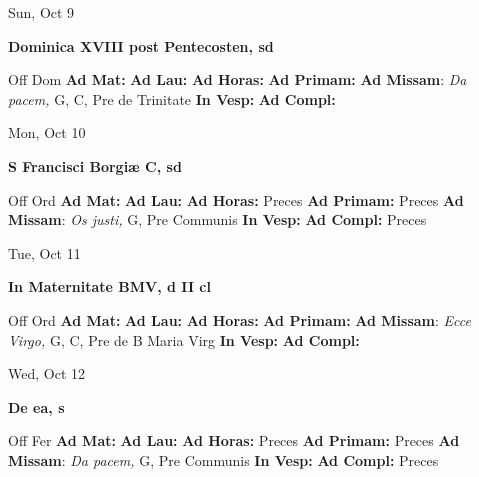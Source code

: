 \documentclass[10pt]{article}
\begin{document}
\begin{minipage}{3.5in}
\vspace{2em}\begin{center}
Sun, Oct 9
\end{center}\textbf{ \large Dominica XVIII post Pentecosten, \textnormal{\normalsize sd}}
\begin{justify}
Off Dom
\textbf{Ad Mat: }
\textbf{Ad Lau: }
\textbf{Ad Horas: }
\textbf{Ad Primam: }
\textbf{Ad Missam}: \textit{Da pacem,} G, C, Pre de Trinitate
\textbf{In Vesp: }
\textbf{Ad Compl: }\end{justify}
\end{minipage}



\begin{minipage}{3.5in}
\vspace{2em}\begin{center}
Mon, Oct 10
\end{center}\textbf{ \large S Francisci Borgiæ C, \textnormal{\normalsize sd}}
\begin{justify}
Off Ord
\textbf{Ad Mat: }
\textbf{Ad Lau: }
\textbf{Ad Horas: }Preces
\textbf{Ad Primam: }Preces
\textbf{Ad Missam}: \textit{Os justi,} G, Pre Communis
\textbf{In Vesp: }
\textbf{Ad Compl: }Preces\end{justify}
\end{minipage}



\begin{minipage}{3.5in}
\vspace{2em}\begin{center}
Tue, Oct 11
\end{center}\textbf{ \large In Maternitate BMV, \textnormal{\normalsize d II cl}}
\begin{justify}
Off Ord
\textbf{Ad Mat: }
\textbf{Ad Lau: }
\textbf{Ad Horas: }
\textbf{Ad Primam: }
\textbf{Ad Missam}: \textit{Ecce Virgo,} G, C, Pre de B Maria Virg
\textbf{In Vesp: }
\textbf{Ad Compl: }\end{justify}
\end{minipage}



\begin{minipage}{3.5in}
\vspace{2em}\begin{center}
Wed, Oct 12
\end{center}\textbf{ \large De ea, \textnormal{\normalsize s}}
\begin{justify}
Off Fer
\textbf{Ad Mat: }
\textbf{Ad Lau: }
\textbf{Ad Horas: }Preces
\textbf{Ad Primam: }Preces
\textbf{Ad Missam}: \textit{Da pacem,} G, Pre Communis
\textbf{In Vesp: }
\textbf{Ad Compl: }Preces\end{justify}
\end{minipage}
\end{document}
